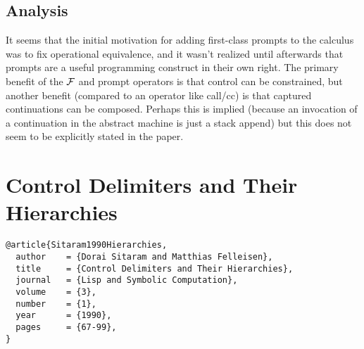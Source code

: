 \documentclass[letterpaper]{llncs}
\begin{document}
\subsection*{Analysis}

It seems that the initial motivation for adding first-class prompts to the calculus was to fix operational equivalence, and it wasn't realized until afterwards that prompts are a useful programming construct in their own right. The primary benefit of the $ \mathcal{F} $ and prompt operators is that control can be constrained, but another benefit (compared to an operator like call/cc) is that captured continuations can be composed. Perhaps this is implied (because an invocation of a continuation in the abstract machine is just a stack append) but this does not seem to be explicitly stated in the paper.






\section*{Control Delimiters and Their Hierarchies}%

\begin{verbatim}
@article{Sitaram1990Hierarchies,
  author    = {Dorai Sitaram and Matthias Felleisen},
  title     = {Control Delimiters and Their Hierarchies},
  journal   = {Lisp and Symbolic Computation},
  volume    = {3},
  number    = {1},
  year      = {1990},
  pages     = {67-99},
}
\end{verbatim}

\end{document}
